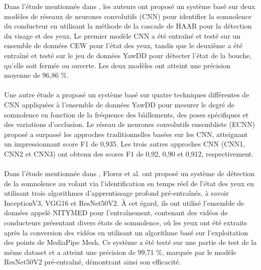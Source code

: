 Dans l’étude mentionnée dans \textbf{\cite{rajkar2022driver}}, les auteurs ont proposé un système basé sur deux modèles de réseaux de neurones convolutifs (CNN) pour identifier la somnolence du conducteur en utilisant la méthode de la cascade de HAAR pour la détection du visage et des yeux. Le premier modèle CNN a été entraîné et testé sur un ensemble de données CEW pour l'état des yeux, tandis que le deuxième a été entraîné et testé sur le jeu de données YawDD pour détecter l'état de la bouche, qu'elle soit fermée ou ouverte. Les deux modèles ont atteint une précision moyenne de 96,86 \%.\\ \\


Une autre étude \textbf{\cite{salman2021driver}} a proposé un système basé sur quatre techniques différentes de CNN appliquées à l'ensemble de données YawDD pour mesurer le degré de somnolence en fonction de la fréquence des bâillements, des poses spécifiques et des variations d'occlusion. Le réseau de neurones convolutifs ensembliste (ECNN) proposé a surpassé les approches traditionnelles basées sur les CNN, atteignant un impressionnant score F1 de 0,935. Les trois autres approches CNN (CNN1, CNN2 et CNN3) ont obtenu des scores F1 de 0,92, 0,90 et 0,912, respectivement.\\ \\


Dans l’étude mentionnée dans \cite{Florez2023ACA}, Florez et al. ont proposé un système de détection de la somnolence au volant via l’identification en temps réel de l’état des yeux en utilisant trois algorithmes d’apprentissage profond pré-entraînés, à savoir InceptionV3, VGG16 et ResNet50V2. À cet égard, ils ont utilisé l’ensemble de données appelé NITYMED pour l'entraînement, contenant des vidéos de conducteurs présentant divers états de somnolence, où les yeux ont été extraits après la conversion des vidéos en utilisant un algorithme basé sur l'exploitation des points de MediaPipe Mesh. Ce système a été testé sur une partie de test de la même dataset et a atteint une précision de 99,71 \%, marquée par le modèle ResNet50V2 pré-entraîné, démontrant ainsi son efficacité. %



